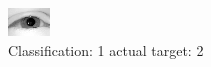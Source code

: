 \begin{figure}[h!]
\begin{center}
\includegraphics[width=0.60\columnwidth]{figures/ID2334_class_1_target_2.png}
\end{center}
\caption{ Classification: 1 actual target: 2}
\label{fig:ID2334_class_1_target_2}
\end{figure}
